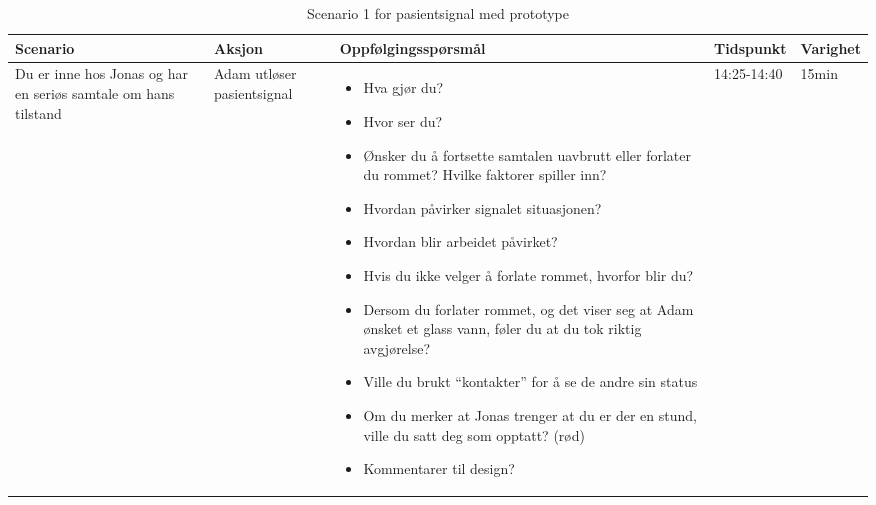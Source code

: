 \begin{table}[H]
\small
\caption{Scenario 1 for pasientsignal med prototype}
\begin{tabular}{p{3cm}|p{2cm}|p{4cm}|l|l}
\hline
\textbf{Scenario} & \textbf{Aksjon} & \textbf{Oppfølgingsspørsmål} & \textbf{Tidspunkt} & \textbf{Varighet}\\
\hline
Du er inne hos Jonas og har en seriøs samtale om hans tilstand & Adam utløser pasientsignal & \begin{itemize}
\item Hva gjør du?
\item Hvor ser du?
\item Ønsker du å fortsette samtalen uavbrutt eller forlater du rommet? Hvilke faktorer spiller inn?
\item Hvordan påvirker signalet situasjonen?
\item Hvordan blir arbeidet påvirket?
\item Hvis du ikke velger å forlate rommet, hvorfor blir du?
\item Dersom du forlater rommet, og det viser seg at Adam ønsket et glass vann, føler du at du tok riktig avgjørelse?
\item Ville du brukt “kontakter” for å se de andre sin status
\item Om du merker at Jonas trenger at du er der en stund, ville du satt deg som opptatt? (rød)
\item Kommentarer til design?
\end{itemize}
& 14:25-14:40 & 15min\\
\end{tabular}
\label{Steg3.3}
\end{table}

